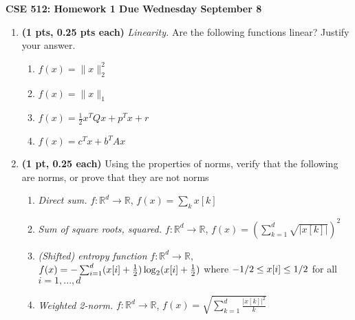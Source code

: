 \documentclass{article}
\newcommand{\mypagebreak}{\begin{center}
		\noindent\makebox[\linewidth]{\rule{7.5in}{1pt}}
	\end{center}}
\newcommand{\R}{\mathbb R}
\newcommand{\idx}[1]{{\scriptsize [#1]}}
\newcommand{\showpoints}[1]{\textbf{(#1)}}
\begin{document}
{\Large\textbf{CSE 512: Homework 1 \hfill
Due Wednesday September 8}}


\mypagebreak

\begin{enumerate}


\item \showpoints{1 pts, 0.25 pts each}  \emph{Linearity.} Are the following functions linear? Justify your answer.

\begin{enumerate}
\item $f(x) = \|x\|_2^2$
\item $f(x) = \|x\|_1$
\item $f(x) = \frac{1}{2}x^TQx + p^Tx + r$
\item $f(x) = c^Tx + b^TAx$
\end{enumerate}





\item \showpoints{1 pt, 0.25 each} Using the properties of norms, verify that the following are norms, or prove that they are not norms









\begin{enumerate}
\item \emph{Direct sum.} $f:\mathbb R^d\to \mathbb R$, $f(x) = \sum_k x[k]$


\item \emph{Sum of square roots, squared.} $f:\mathbb R^d\to \mathbb R$, $f(x) = \left(\sum_{k=1}^d \sqrt{|x[k]|}\right)^2$



\item \emph{(Shifted) entropy function} $f:\mathbb R^d\to\R$, $f(x) = -\sum_{i=1}^d (x\idx{i}+\tfrac{1}{2}) \log_2(x\idx{i}+\tfrac{1}{2})$ where $-1/2 \leq x\idx{i}\leq 1/2$ for all $i = 1,...,d$


\item \emph{Weighted 2-norm.}  $f:\mathbb R^d\to \mathbb R$, $f(x) = \sqrt{\sum_{k=1}^d \frac{|x[k]|^2}{k}}$



\end{enumerate}



\end{enumerate}
\end{document}
